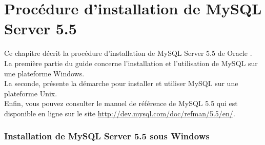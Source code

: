 \section{Procédure d'installation de MySQL Server 5.5}
 Ce chapitre décrit la procédure d'installation de MySQL Server 5.5 de Oracle .\\
 La première partie du guide concerne l’installation et l’utilisation de MySQL sur une plateforme Windows.\\
 La seconde, présente la démarche pour installer et utiliser MySQL sur une plateforme Unix.\\
 Enfin, vous pouvez consulter le manuel de référence de MySQL 5.5 qui est disponible 
en ligne sur le site \url{http://dev.mysql.com/doc/refman/5.5/en/}.

 \subsubsection{Installation de MySQL Server 5.5 sous Windows}
